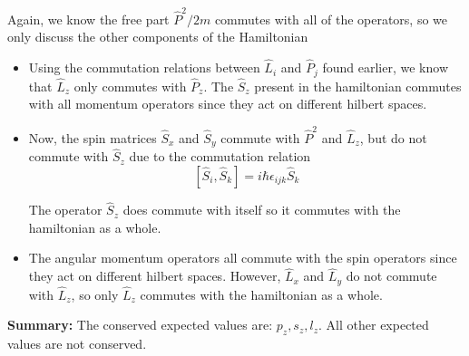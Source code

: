 \documentclass{article}
\begin{document}
\begin{enumerate}[label=(\alph*)]
  \vskip 0.5cm
  Again, we know the free part $\hat{P}^2 / 2m$ commutes with all of the operators, so we only discuss the other components of the Hamiltonian

  \vskip 0.5cm
  \begin{itemize}
    \item Using the commutation relations between $\hat{L}_i$ and $\hat{P}_j$ found earlier, we know that $\hat{L}_z$ only commutes with $\hat{P}_z$. The $\hat{S}_z$ present in the hamiltonian commutes with all momentum operators since they act on different hilbert spaces.
    
    \item Now, the spin matrices $\hat{S}_x$ and $\hat{S}_y$ commute with $\hat{P}^2$ and $\hat{L}_z$, but do not commute with $\hat{S}_z$ due to the commutation relation 
    \[ [\hat{S}_i, \hat{S}_k] = i\hbar \epsilon_{ijk} \hat{S}_k \]

    The operator $\hat{S}_z$ does commute with itself so it commutes with the hamiltonian as a whole.
    
    \item The angular momentum operators all commute with the spin operators since they act on different hilbert spaces. However, $\hat{L}_x$ and $\hat{L}_y$ do not commute with $\hat{L}_z$, so only $\hat{L}_z$ commutes with the hamiltonian as a whole.
  \end{itemize}
  \textbf{Summary:} The conserved expected values are: $p_z, s_z, l_z$. All other expected values are not conserved.
\end{enumerate}

\end{document}
